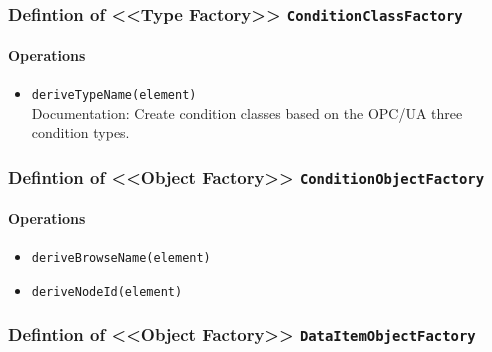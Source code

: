 \subsubsection{Defintion of <<Type Factory>> \texttt{ConditionClassFactory}} \label{type:ConditionClassFactory}

\FloatBarrier



\paragraph{Operations}
\begin{itemize}
  \item \texttt{deriveTypeName(element)}\\
    Documentation: Create condition classes based on the OPC/UA three condition  types.

\end{itemize}
\subsubsection{Defintion of <<Object Factory>> \texttt{ConditionObjectFactory}} \label{type:ConditionObjectFactory}

\FloatBarrier



\paragraph{Operations}
\begin{itemize}
  \item \texttt{deriveBrowseName(element)}
  \item \texttt{deriveNodeId(element)}
\end{itemize}
\subsubsection{Defintion of <<Object Factory>> \texttt{DataItemObjectFactory}} \label{type:DataItemObjectFactory}

\FloatBarrier



